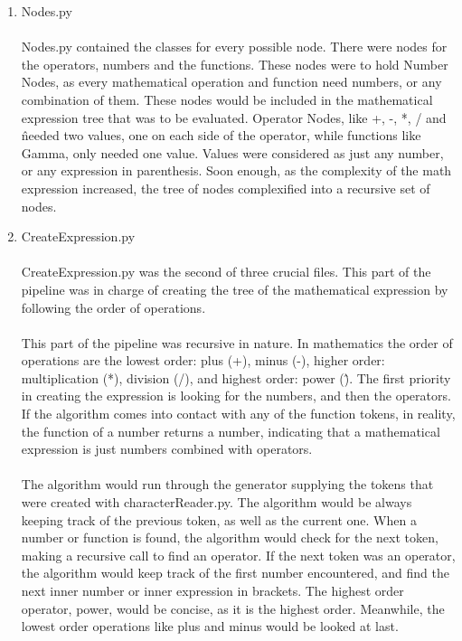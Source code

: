 \begin{enumerate}
            \item Nodes.py
            \paragraph{}
            Nodes.py contained the classes for every possible node. There were nodes for the operators, numbers and the functions. These nodes were to hold Number Nodes, as every mathematical operation and function need numbers, or any combination of them. These nodes would be included in the mathematical expression tree that was to be evaluated. Operator Nodes, like +, -, *, / and \^ needed two values, one on each side of the operator, while functions like Gamma, only needed one value. Values were considered as just any number, or any expression in parenthesis. Soon enough, as the complexity of the math expression increased, the tree of nodes complexified into a recursive set of nodes.

            \item CreateExpression.py
            \paragraph{}
            CreateExpression.py was the second of three crucial files. This part of the pipeline was in charge of creating the tree of the mathematical expression by following the order of operations.

            \paragraph{}
            This part of the pipeline was recursive in nature. In mathematics the order of operations are the lowest order:  plus (+), minus (-), higher order: multiplication (*), division (/), and highest order: power (\^). The first priority in creating the expression is looking for the numbers, and then the operators. If the algorithm comes into contact with any of the function tokens, in reality, the function of a number returns a number, indicating that a mathematical expression is just numbers combined with operators.

            \paragraph{}
            The algorithm would run through the generator supplying the tokens that were created with characterReader.py. The algorithm would be always keeping track of the previous token, as well as the current one.  When a number or function is found, the algorithm would check for the next token, making a recursive call to find an operator. If the next token was an operator, the algorithm would keep track of the first number encountered, and find the next inner number or inner expression in brackets. The highest order operator, power, would be concise, as it is the highest order. Meanwhile, the lowest order operations like plus and minus would be looked at last.


\end{enumerate}
